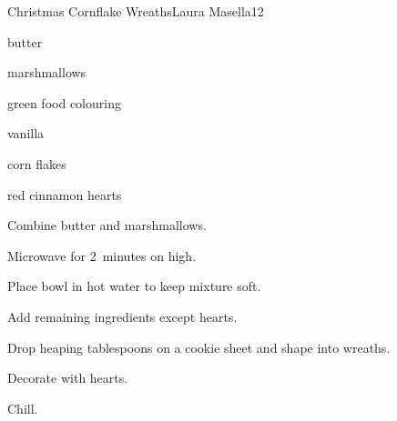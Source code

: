 \begin{recipe}{Christmas Cornflake Wreaths}{Laura Masella}{12}

\begin{ingredients}
\item \C{\half} butter
\item {} marshmallows
\item {} green food colouring
\item {} vanilla
\item {} corn flakes
\item red cinnamon hearts
\end{ingredients}

\begin{directions}
\item Combine butter and marshmallows.
\item Microwave for 2~minutes on high.
\item Place bowl in hot water to keep mixture soft.
\item Add remaining ingredients except hearts.
\item Drop heaping tablespoons on a cookie sheet and shape into wreaths.
\item Decorate with hearts.
\item Chill.
\end{directions}

\end{recipe}
